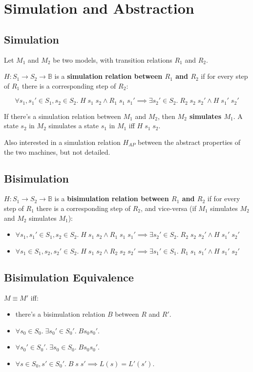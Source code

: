 \documentclass[a4paper, 11pt]{article}
\begin{document}
\section*{Simulation and Abstraction}
{
    \subsection*{Simulation}
    {
        Let \(M_1\) and \(M_2\) be two models, with transition relations \(R_1\) and \(R_2\).

        \(H : S_1 \rightarrow S_2 \rightarrow \mathbb{B}\) is a \textbf{simulation relation between \(R_1\) and \(R_2\)} if for every step of \(R_1\) there is a corresponding step of \(R_2\):

        \[\forall s_1,s_1' \in S_1, s_2 \in S_2.\; H\;s_1\;s_2 \wedge R_1\;s_1\;s_1' \implies \exists s_2' \in S_2.\;R_2\;s_2\;s_2' \wedge H\;s_1'\;s_2'\]

        If there's a simulation relation between \(M_1\) and \(M_2\), then \textbf{\(M_2\) simulates \(M_1\)}. A state \(s_2\) in \(M_2\) simulates a state \(s_1\) in \(M_1\) iff \(H\;s_1\;s_2\).

        Also interested in a simulation relation \(H_{AP}\) between the abstract properties of the two machines, but not detailed.
    }
    \subsection*{Bisimulation}
    {
        \(H : S_1 \rightarrow S_2 \rightarrow \mathbb{B}\) is a \textbf{bisimulation relation between \(R_1\) and \(R_2\)} if for every step of \(R_1\) there is a corresponding step of \(R_2\), and vice-versa (if \(M_1\) simulates \(M_2\) and \(M_2\) simulates \(M_1\)):

        \begin{itemize}
        \item \(\forall s_1,s_1' \in S_1, s_2 \in S_2.\; H\;s_1\;s_2 \wedge R_1\;s_1\;s_1' \implies \exists s_2' \in S_2.\;R_2\;s_2\;s_2' \wedge H\;s_1'\;s_2'\)
        \item \(\forall s_1 \in S_1, s_2,s_2' \in S_2.\; H\;s_1\;s_2 \wedge R_2\;s_2\;s_2' \implies \exists s_1' \in S_1.\;R_1\;s_1\;s_1' \wedge H\;s_1'\;s_2'\)
        \end{itemize}
    }
    \subsection*{Bisimulation Equivalence}
    {
        \(M \equiv M'\) iff:
        \begin{itemize}
        \item there's a bisimulation relation \(B\) between \(R\) and \(R'\).
        \item \(\forall s_0 \in S_0.\;\exists s_0' \in S_0'.\;B s_0 s_0'\).
        \item \(\forall s_0' \in S_0'.\;\exists s_0 \in S_0.\;B s_0 s_0'\).
        \item \(\forall s \in S_0, s' \in S_0'.\; B\;s\;s' \implies L(s) = L'(s')\).
        \end{itemize}

}}
\end{document}
